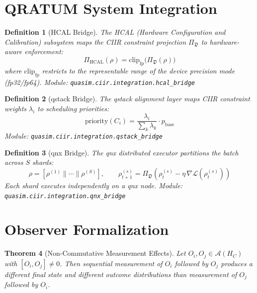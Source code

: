 \documentclass[11pt,a4paper]{article}
\newtheorem{definition}{Definition}[section]
\newtheorem{theorem}[definition]{Theorem}
\newcommand{\HC}{H_C}
\newcommand{\CA}{\mathcal{A}}
\newcommand{\CL}{\mathcal{L}}
\begin{document}
\section{QRATUM System Integration}
\label{sec:qratum}

\begin{definition}[HCAL Bridge]
\label{def:hcal}
The HCAL (Hardware Configuration and Calibration) subsystem maps the
CIIR constraint projection $\Pi_{\mathfrak{D}}$ to hardware-aware
enforcement:
\[
  \Pi_{\mathrm{HCAL}}(\rho) = \mathrm{clip}_{\mathrm{fp}}
    \bigl(\Pi_{\mathfrak{D}}(\rho)\bigr)
\]
where $\mathrm{clip}_{\mathrm{fp}}$ restricts to the representable
range of the device precision mode (fp32/fp64).
Module: \texttt{quasim.ciir.integration.hcal\_bridge}
\end{definition}

\begin{definition}[qstack Bridge]
\label{def:qstack}
The qstack alignment layer maps CIIR constraint weights $\lambda_i$
to scheduling priorities:
\[
  \mathrm{priority}(C_i) = \frac{\lambda_i}{\sum_k \lambda_k}
    \cdot p_{\mathrm{base}}
\]
Module: \texttt{quasim.ciir.integration.qstack\_bridge}
\end{definition}

\begin{definition}[qnx Bridge]
\label{def:qnx}
The qnx distributed executor partitions the batch across $S$ shards:
\[
  \rho = [\rho^{(1)} \| \cdots \| \rho^{(S)}],
  \qquad
  \rho^{(s)}_{t+1} = \Pi_{\mathfrak{D}}
    (\rho^{(s)}_t - \eta\, \nabla \CL(\rho^{(s)}_t))
\]
Each shard executes independently on a qnx node.
Module: \texttt{quasim.ciir.integration.qnx\_bridge}
\end{definition}

\section{Observer Formalization}
\label{sec:observers}

\begin{theorem}[Non-Commutative Measurement Effects]
\label{thm:noncomm}
Let $O_i, O_j \in \CA(\HC)$ with $[O_i, O_j] \neq 0$.
Then sequential measurement of $O_i$ followed by $O_j$ produces
a different final state and different outcome distributions than
measurement of $O_j$ followed by $O_i$.
\end{theorem}
\end{document}
